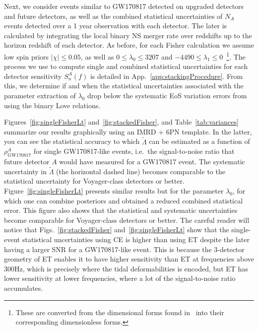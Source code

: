 \documentclass[prd,twocolumn,nofootinbib,superscriptaddress,amsmath,amssymb]{revtex4-1}
\begin{document}
Next, we consider events similar to GW170817 detected on upgraded detectors and future detectors, as well as the combined statistical uncertainties of $N_A$ events detected over a 1 year observation with each detector. The later is calculated by integrating the local binary NS merger rate over redshifts up to the horizon redshift of each detector. As before, for each Fisher calculation we assume low spin priors $|\chi| \leq 0.05$, as well as $0 \leq \lambda_0 \leq 3207$ and $-4490 \leq \lambda_1 \leq 0$~\cite{delPozzo:TaylorTidal}\footnote{These are converted from the dimensional forms found in~\cite{delPozzo:TaylorTidal} into their corresponding dimensionless forms.}.
The process we use to compute single and combined statistical uncertainties for each detector sensitivity $S_n^A(f)$ is detailed in App.~\ref{app:stackingProcedure}.
From this, we determine if and when the statistical uncertainties associated with the parameter extraction of $\lambda_0$ drop below the systematic EoS variation errors from using the binary Love relations.

Figures~\ref{fig:singleFisherLt} and~\ref{fig:stackedFisher}, and Table~\ref{tab:variances} summarize our results graphically using an IMRD + 6PN template. In the latter, you can see the statistical accuracy to which $\tilde{\Lambda}$ can be estimated as a function of $\rho^A_{\text{GW170817}}$ for single GW170817-like events, i.e.~the signal-to-noise ratio that future detector $A$ would have measured for a GW170817 event. The systematic uncertainty in $\tilde{\Lambda}$ (the horizontal dashed line) becomes comparable to the statistical uncertainty for Voyager-class detectors or better. Figure~\ref{fig:singleFisherLt} presents similar results but for the parameter $\lambda_{0}$, for which one can combine posteriors and obtained a reduced combined statistical error. This figure also shows that the statistical and systematic uncertainties become comparable for Voyager-class detectors or better. The careful reader will notice that Figs.~\ref{fig:stackedFisher} and~\ref{fig:singleFisherLt} show that the single-event statistical uncertainties using CE is higher than using ET despite the later having a larger SNR for a GW170817-like event. This is because the 3-detector geometry of ET enables it to have higher sensitivity than ET at frequencies above 300Hz, which is precisely where the tidal deformabilities is encoded, but ET has lower sensitivity at lower frequencies, where a lot of the signal-to-noise ratio accumulates.  
\end{document}

